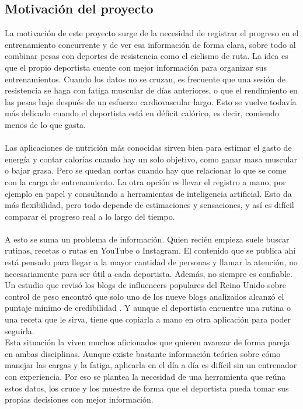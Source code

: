 \subsection{Motivación del proyecto}
La motivación de este proyecto surge de la necesidad de registrar el progreso en el entrenamiento concurrente y de ver esa información de forma clara, sobre todo al combinar pesas con deportes de resistencia como el ciclismo de ruta. La idea es que el propio deportista cuente con mejor información para organizar sus entrenamientos. Cuando los datos no se cruzan, es frecuente que una sesión de resistencia se haga con fatiga muscular de días anteriores, o que el rendimiento en las pesas baje después de un esfuerzo cardiovascular largo. Esto se vuelve todavía más delicado cuando el deportista está en déficit calórico, es decir, comiendo menos de lo que gasta.
\\\\
Las aplicaciones de nutrición más conocidas sirven bien para estimar el gasto de energía y contar calorías cuando hay un solo objetivo, como ganar masa muscular o bajar grasa. Pero se quedan cortas cuando hay que relacionar lo que se come con la carga de entrenamiento. La otra opción es llevar el registro a mano, por ejemplo en papel y consultando a herramientas de inteligencia artificial. Esto da más flexibilidad, pero todo depende de estimaciones y sensaciones, y así es difícil comparar el progreso real a lo largo del tiempo.
\\\\
A esto se suma un problema de información. Quien recién empieza suele buscar rutinas, recetas o rutas en YouTube o Instagram. El contenido que se publica ahí está pensado para llegar a la mayor cantidad de personas y llamar la atención, no necesariamente para ser útil a cada deportista. Además, no siempre es confiable. Un estudio que revisó los blogs de influencers populares del Reino Unido sobre control de peso encontró que solo uno de los nueve blogs analizados alcanzó el puntaje mínimo de credibilidad \citep{sabbagh2020credibility}. Y aunque el deportista encuentre una rutina o una receta que le sirva, tiene que copiarla a mano en otra aplicación para poder seguirla.
\\
Esta situación la viven muchos aficionados que quieren avanzar de forma pareja en ambas disciplinas. Aunque existe bastante información teórica sobre cómo manejar las cargas y la fatiga, aplicarla en el día a día es difícil sin un entrenador con experiencia. Por eso se plantea la necesidad de una herramienta que reúna estos datos, los cruce y los muestre de forma que el deportista pueda tomar sus propias decisiones con mejor información.
\newpage
